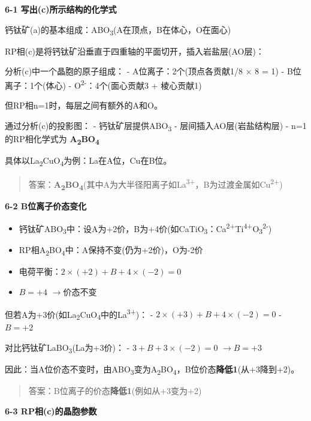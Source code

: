 \documentclass[a4paper,11pt]{ctexart}
\providecommand{\tightlist}{\setlength{\itemsep}{0pt}\setlength{\parskip}{0pt}}
\newcommand{\箭}{\ensuremath{\rightarrow}}
\newcommand{\左箭}{\ensuremath{\leftarrow}}
\newcommand{\上箭}{\ensuremath{\uparrow}}
\newcommand{\下箭}{\ensuremath{\downarrow}}
\newcommand{\衡}{\ensuremath{\rightleftharpoons}}
\newcommand{\双箭}{\ensuremath{\leftrightarrow}}
\newcommand{\约等于}{\ensuremath{\approx}}
\newcommand{\小于等于}{\ensuremath{\leq}}
\newcommand{\大于等于}{\ensuremath{\geq}}
\newcommand{\不等于}{\ensuremath{\neq}}
\newcommand{\西格马}{\ensuremath{\sigma}}
\newcommand{\派}{\ensuremath{\pi}}
\begin{document}
\textbf{6-1 写出(c)所示结构的化学式}

钙钛矿(a)的基本组成：ABO\textsubscript{3}(A在顶点，B在体心，O在面心)

RP相(c)是将钙钛矿沿垂直于四重轴的平面切开，插入岩盐层(AO层)：

分析(c)中一个晶胞的原子组成：
- A位离子：2个(顶点各贡献1/8 × 8 = 1)
- B位离子：1个(体心)
- O\textsuperscript{2-}：4个(面心贡献3 + 棱心贡献1)

但RP相n=1时，每层之间有额外的A和O。

通过分析(c)的投影图：
- 钙钛矿层提供ABO\textsubscript{3}
- 层间插入AO层(岩盐结构层)
- n=1的RP相化学式为 \textbf{A\textsubscript{2}BO\textsubscript{4}}

具体以La\textsubscript{2}CuO\textsubscript{4}为例：La在A位，Cu在B位。

\begin{quote}
答案：\textbf{A\textsubscript{2}BO\textsubscript{4}}(其中A为大半径阳离子如La\textsuperscript{3+}，B为过渡金属如Cu\textsuperscript{2+})
\end{quote}

\textbf{6-2 B位离子价态变化}

\begin{itemize}
\tightlist
\item
  钙钛矿ABO\textsubscript{3}中：设A为+2价，B为+4价(如CaTiO\textsubscript{3}：Ca\textsuperscript{2+}Ti\textsuperscript{4+}O\textsubscript{3}\textsuperscript{2-})
\item
  RP相A\textsubscript{2}BO\textsubscript{4}中：A保持不变(仍为+2价)，O为-2价
\item
  电荷平衡：\(2 \times (+2) + B + 4 \times (-2) = 0\)
\item
  \(B = +4\) \箭 价态不变
\end{itemize}

但若A为+3价(如La\textsubscript{2}CuO\textsubscript{4}中的La\textsuperscript{3+})：
- \(2 \times (+3) + B + 4 \times (-2) = 0\)
- \(B = +2\)

对比钙钛矿LaBO\textsubscript{3}(La为+3价)：
- \(3 + B + 3 \times (-2) = 0\) \箭 \(B = +3\)

因此：当A位价态不变时，由ABO\textsubscript{3}变为A\textsubscript{2}BO\textsubscript{4}，B位价态\textbf{降低1}(从+3降到+2)。

\begin{quote}
答案：B位离子的价态\textbf{降低1}(例如从+3变为+2)
\end{quote}

\textbf{6-3 RP相(c)的晶胞参数}
\end{document}
